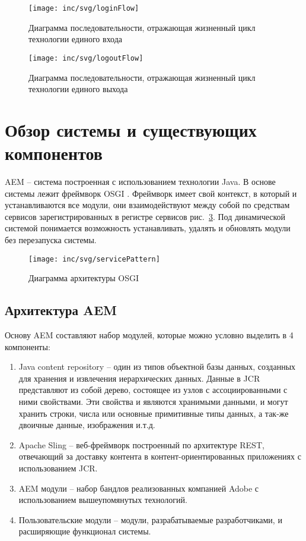 \begin{figure}[h]
  \centering
  \texttt{[image: inc/svg/loginFlow]}
  \caption{Диаграмма последовательности, отражающая жизненный цикл технологии единого входа}
  \label{fig:loginFlow}
\end{figure}

\begin{figure}[h]
  \centering
  \texttt{[image: inc/svg/logoutFlow]}
  \caption{Диаграмма последовательности, отражающая жизненный цикл технологии единого выхода}
  \label{fig:logoutFlow}
\end{figure}

\section{Обзор системы и существующих компонентов}

AEM – система построенная с использованием технологии Java. В основе системы лежит фреймворк OSGI \cite{osgiInAction}. Фреймворк имеет свой контекст, в который и устанавливаются все модули, они взаимодействуют между собой по средствам сервисов зарегистрированных в регистре сервисов рис.~\ref{fig:servicePattern}. Под динамической системой понимается возможность устанавливать, удалять и обновлять модули без перезапуска системы.

\begin{figure}[h]
  \centering
  \texttt{[image: inc/svg/servicePattern]}
  \caption{Диаграмма архитектуры OSGI}
  \label{fig:servicePattern}
\end{figure}

\subsection{Архитектура AEM}
Основу AEM составляют набор модулей, которые можно условно выделить в 4 компоненты:
\begin{enumerate}
\item Java content repository – один из типов объектной базы данных, созданных для хранения и извлечения иерархических данных. Данные в JCR представляют из собой дерево, состоящее из узлов с ассоциированными с ними свойствами. Эти свойства и являются хранимыми данными, и могут хранить строки, числа или основные примитивные типы данных, а так-же двоичные данные, изображения и.т.д. 
\item Apache Sling – веб-фреймворк построенный по архитектуре REST, отвечающий за доставку контента в контент-ориентированных приложениях с использованием JCR.
\item AEM модули – набор бандлов реализованных компанией Adobe с использованием вышеупомянутых технологий.
\item Пользовательские модули – модули, разрабатываемые разработчиками, и расширяющие функционал системы.
\end{enumerate}

